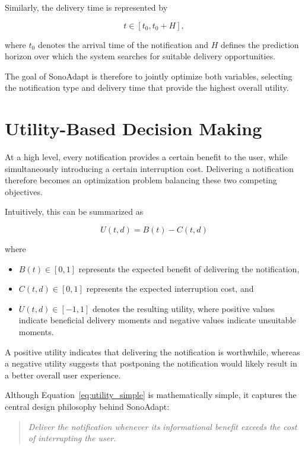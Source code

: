 Similarly, the delivery time is represented by

\[
t \in [t_0,t_0+H],
\]

where $t_0$ denotes the arrival time of the notification and $H$ defines the prediction horizon over which the system searches for suitable delivery opportunities.

The goal of SonoAdapt is therefore to jointly optimize both variables, selecting the notification type and delivery time that provide the highest overall utility.

\section{Utility-Based Decision Making}

At a high level, every notification provides a certain benefit to the user, while simultaneously introducing a certain interruption cost. Delivering a notification therefore becomes an optimization problem balancing these two competing objectives.

Intuitively, this can be summarized as

\begin{equation}
\boxed{
U(t,d)=B(t)-C(t,d)
}
\label{eq:utility_simple}
\end{equation}

where

\begin{itemize}
    \item $B(t) \in [0, 1]$ represents the expected benefit of delivering the notification,
    \item $C(t,d) \in [0, 1]$ represents the expected interruption cost, and
    \item $U(t,d) \in [-1, 1]$ denotes the resulting utility, where positive values indicate beneficial delivery moments and negative values indicate unsuitable moments.
\end{itemize}

A positive utility indicates that delivering the notification is worthwhile, whereas a negative utility suggests that postponing the notification would likely result in a better overall user experience.

Although Equation~\ref{eq:utility_simple} is mathematically simple, it captures the central design philosophy behind SonoAdapt:

\begin{quote}
\textit{Deliver the notification whenever its informational benefit exceeds the cost of interrupting the user.}
\end{quote}

